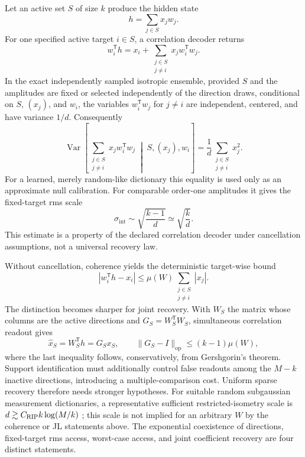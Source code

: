 \documentclass[
  aps,
  reprint,
  superscriptaddress,
  floatfix,
  nofootinbib,
  longbibliography
]{revtex4-2}
\newcommand{\Msem}{M}
\newcommand{\sint}{\sigma_{\mathrm{int}}}
\newcommand{\T}{^{\mathsf{T}}}
\newcommand{\opnorm}[1]{\lVert #1 \rVert_{\mathrm{op}}}
\DeclareMathOperator{\Var}{Var}
\begin{document}
Let an active set $S$ of size $k$ produce the hidden state
\begin{equation}
\label{eq:hidden}
h=\sum_{j\in S}x_jw_j .
\end{equation}
For one specified active target $i\in S$, a correlation decoder returns
\begin{equation}
\label{eq:readout}
w_i\T h
=x_i+
\sum_{\substack{j\in S\\j\ne i}}
x_jw_i\T w_j.
\end{equation}
In the exact independently sampled isotropic ensemble, provided $S$ and the
amplitudes are fixed or selected independently of the direction draws,
conditional on $S$, $(x_j)$, and $w_i$, the variables $w_i\T w_j$ for $j\ne i$
are independent, centered, and have variance $1/d$.  Consequently
\begin{equation}
\label{eq:intvar}
\Var\!\left[
\sum_{\substack{j\in S\\j\ne i}}
x_jw_i\T w_j
\;\middle|\;S,(x_j),w_i
\right]
=
\frac{1}{d}
\sum_{\substack{j\in S\\j\ne i}}x_j^2 .
\end{equation}
For a learned, merely random-like dictionary this equality is used only as an
approximate null calibration.  For comparable order-one amplitudes it gives
the fixed-target rms scale
\begin{equation}
\label{eq:sint}
\sint
\sim\sqrt{\frac{k-1}{d}}
\simeq\sqrt{\frac{k}{d}}.
\end{equation}
This estimate is a property of the declared correlation decoder under
cancellation assumptions, not a universal recovery law.

Without cancellation, coherence yields the deterministic target-wise bound
\begin{equation}
\label{eq:worst-readout}
|w_i\T h-x_i|
\leq
\mu(W)\sum_{\substack{j\in S\\j\ne i}}|x_j|.
\end{equation}
The distinction becomes sharper for joint recovery.  With $W_S$ the matrix
whose columns are the active directions and
$G_S=W_S\T W_S$, simultaneous correlation readout gives
\begin{equation}
\label{eq:joint-readout}
\widehat{x}_S
=W_S\T h
=G_Sx_S,
\qquad
\opnorm{G_S-I}
\leq(k-1)\mu(W),
\end{equation}
where the last inequality follows, conservatively, from Gershgorin's theorem.
Support identification must additionally control false readouts among the
$\Msem-k$ inactive directions, introducing a multiple-comparison cost.
Uniform sparse recovery therefore needs stronger hypotheses.  For suitable
random subgaussian measurement dictionaries, a representative sufficient
restricted-isometry scale is
$d\gtrsim C_{\rm RIP}k\log(\Msem/k)$
\cite{donoho2006compressed,candes2006robust,foucart2013mathematical}; this scale
is not implied for an arbitrary $W$ by the coherence or JL statements above.
The exponential coexistence of directions, fixed-target rms access, worst-case
access, and joint coefficient recovery are four distinct statements.
\end{document}
